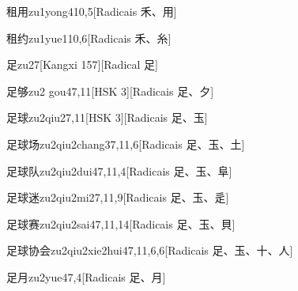 \begin{entry}{租用}{zu1yong4}{10,5}[Radicais ⽲、⽤]
\end{entry}

\begin{entry}{租约}{zu1yue1}{10,6}[Radicais ⽲、⽷]
\end{entry}

\begin{entry}{足}{zu2}{7}[Kangxi 157][Radical ⾜]
\end{entry}

\begin{entry}{足够}{zu2 gou4}{7,11}[HSK 3][Radicais ⾜、⼣]
\end{entry}

\begin{entry}{足球}{zu2qiu2}{7,11}[HSK 3][Radicais ⾜、⽟]
\end{entry}

\begin{entry}{足球场}{zu2qiu2chang3}{7,11,6}[Radicais ⾜、⽟、⼟]
\end{entry}

\begin{entry}{足球队}{zu2qiu2dui4}{7,11,4}[Radicais ⾜、⽟、⾩]
\end{entry}

\begin{entry}{足球迷}{zu2qiu2mi2}{7,11,9}[Radicais ⾜、⽟、⾡]
\end{entry}

\begin{entry}{足球赛}{zu2qiu2sai4}{7,11,14}[Radicais ⾜、⽟、⾙]
\end{entry}

\begin{entry}{足球协会}{zu2qiu2xie2hui4}{7,11,6,6}[Radicais ⾜、⽟、⼗、⼈]
\end{entry}

\begin{entry}{足月}{zu2yue4}{7,4}[Radicais ⾜、⽉]
\end{entry}

